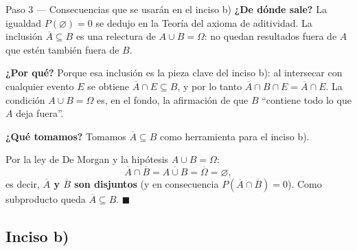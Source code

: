 \documentclass[11pt]{article}
\begin{document}
\begin{sol}
\begin{paso}{Paso 3 --- Consecuencias que se usarán en el inciso b)}
\textbf{¿De dónde sale?} La igualdad $P(\varnothing)=0$ se dedujo en la Teoría del axioma de
aditividad. La inclusión $\overline{A}\subseteq B$ es una relectura de $A\cup B=\Omega$: no
quedan resultados fuera de $A$ que estén también fuera de $B$.

\textbf{¿Por qué?} Porque esa inclusión es la pieza clave del inciso b): al intersecar con
cualquier evento $E$ se obtiene $\overline{A}\cap E\subseteq B$, y por lo tanto
$\overline{A}\cap B\cap E=\overline{A}\cap E$. La condición $A\cup B=\Omega$ es, en el fondo,
la afirmación de que $B$ ``contiene todo lo que $A$ deja fuera''.

\textbf{¿Qué tomamos?} Tomamos $\overline{A}\subseteq B$ como herramienta para el inciso b).
\end{paso}
\end{sol}

\begin{resp}
Por la ley de De Morgan y la hipótesis $A\cup B=\Omega$:
\[
\overline{A}\cap\overline{B}=\overline{A\cup B}=\overline{\Omega}=\varnothing,
\]
es decir, \textbf{$\overline{A}$ y $\overline{B}$ son disjuntos} (y en consecuencia
$P(\overline{A}\cap\overline{B})=0$). Como subproducto queda $\overline{A}\subseteq B$.
$\blacksquare$
\end{resp}

\subsection*{Inciso b)}
\end{document}
